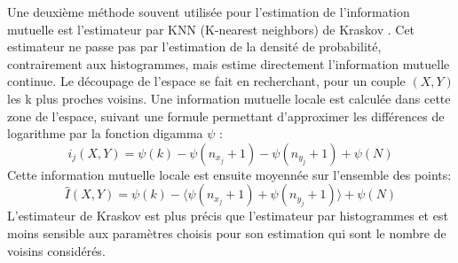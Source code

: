 \documentclass[../main]{subfiles}
\begin{document}
Une deuxième méthode souvent utilisée pour l'estimation de l'information mutuelle est l'estimateur par KNN (K-nearest neighbors) de Kraskov \cite{2004kraskov}.
Cet estimateur ne passe pas par l'estimation de la densité de probabilité, contrairement aux histogrammes, mais estime directement l'information mutuelle continue.
Le découpage de l'espace se fait en recherchant, pour un couple $(X,Y)$ les k plus proches voisins. Une information mutuelle locale est calculée dans cette zone de l'espace, suivant une formule permettant d'approximer les différences de logarithme par la fonction digamma $\psi$ : 
$$i_j(X,Y) = \psi(k) - \psi(n_{x_j} + 1) - \psi(n_{y_j} +1) + \psi(N)$$
Cette information mutuelle locale est ensuite moyennée sur l'ensemble des points: 
$$\hat{I}(X,Y) = \psi(k) - \langle\psi(n_{x_j} + 1) + \psi(n_{y_j} +1)\rangle + \psi(N)$$
L'estimateur de Kraskov est plus précis que l'estimateur par histogrammes et est moins sensible aux paramètres choisis pour son estimation qui sont le nombre de voisins considérés.
\end{document}

